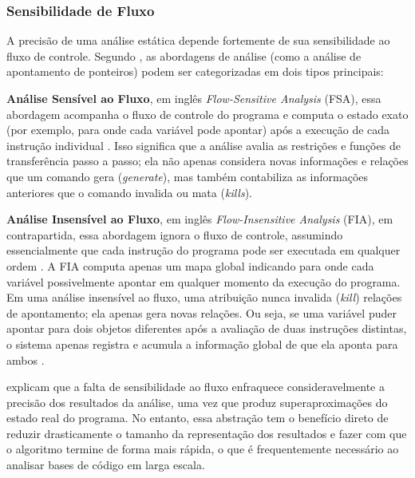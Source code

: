 \documentclass[
    12pt,                %
    openright,           %
    oneside,             %
    a4paper,             %
    english,             %
    brazil               %
]{abntex2}
\begin{document}
\subsubsection{Sensibilidade de Fluxo}
\label{sec:sensifluxo}
\par
A precisão de uma análise estática depende fortemente de sua sensibilidade ao fluxo de controle.
Segundo , as abordagens de análise (como a análise de apontamento de ponteiros) podem ser categorizadas em dois tipos principais:
\par
\textbf{Análise Sensível ao Fluxo}, em inglês \textit{Flow-Sensitive Analysis} (FSA), essa abordagem acompanha o fluxo de controle do programa e computa o estado exato (por exemplo, para onde cada variável pode apontar) após a execução de cada instrução individual .
Isso significa que a análise avalia as restrições e funções de transferência passo a passo; ela não apenas considera novas informações e relações que um comando gera (\textit{generate}), mas também contabiliza as informações anteriores que o comando invalida ou mata (\textit{kills}).
\par
\textbf{Análise Insensível ao Fluxo}, em inglês \textit{Flow-Insensitive Analysis} (FIA), em contrapartida, essa abordagem ignora o fluxo de controle, assumindo essencialmente que cada instrução do programa pode ser executada em qualquer ordem \cite{aho2007compilers}.
A FIA computa apenas um mapa global indicando para onde cada variável possivelmente apontar em qualquer momento da execução do programa.
Em uma análise insensível ao fluxo, uma atribuição nunca invalida (\textit{kill}) relações de apontamento; ela apenas gera novas relações. Ou seja, se uma variável puder apontar para dois objetos diferentes após a avaliação de duas instruções distintas, o sistema apenas registra e acumula a informação global de que ela aponta para ambos \cite{aho2007compilers}.
\par
{} explicam que a falta de sensibilidade ao fluxo enfraquece consideravelmente a precisão dos resultados da análise, uma vez que produz superaproximações do estado real do programa. 
No entanto, essa abstração tem o benefício direto de reduzir drasticamente o tamanho da representação dos resultados e fazer com que o algoritmo termine de forma mais rápida, o que é frequentemente necessário ao analisar bases de código em larga escala.
\end{document}
